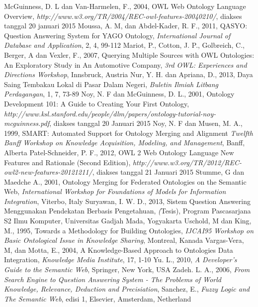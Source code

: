 \begin{thebibliography}{99}
		McGuinness, D. L dan Van-Harmelen, F., 2004, OWL Web Ontology Language Overview, \emph{http://www.w3.org/TR/2004/REC-owl-features-20040210/}, diakses tanggal 20 januari 2015
		Moussa, A. M, dan Abdel-Kader, R. F., 2011, QASYO: Question Answering System for YAGO Ontology, \emph{International Journal of Database and Application}, 2, 4, 99-112
		Mariot, P., Cotton, J. P., Golbreich, C., Berger, A dan Vexler, F., 2007, Querying Multiple Sources with OWL Ontologies: An Exploratory Study in An Automotive Company, \emph{3rd OWL: Experiences and Directions Workshop}, Innsbruck, Austria
		Nur, Y. H. dan Apriana, D., 2013, Daya Saing Tembakau Lokal di Pasar Dalam Negeri, \emph{Buletin Ilmiah Litbang Perdagangan}, 1, 7, 73-89
		Noy, N. F dan McGuinness, D. L., 2001, Ontology Development 101: A Guide to Creating Your First Ontology, \emph{http://www.ksl.stanford.edu/people/dlm/papers/ontology-tutorial-noy-mcguinness.pdf}, diakses tanggal 20 Januari 2015
		Noy, N. F dan Musen, M. A., 1999, SMART: Automated Support for Ontology Merging and Alignment \emph{Twelfth Banff Workshop on Knowledge Acquisition, Modeling, and Management}, Banff, Alberta
		Patel-Schneider, P. F., 2012, OWL 2 Web Ontology Language New Features and Rationale (Second Edition), \emph{http://www.w3.org/TR/2012/REC-owl2-new-features-20121211/}, diakses tanggal 21 Januari 2015
		Stumme, G dan Maedche A., 2001, Ontology Merging for Federated Ontologies on the Semantic Web, \emph{ International Workshop for Foundations of Models for Information Integration}, Viterbo, Italy
		Suryawan, I. W. D., 2013, Sistem Question Answering Menggunakan Pendekatan Berbasis Pengetahuan, \emph(Tesis), Program Pascasarjana S2 Ilmu Komputer, Universitas Gadjah Mada, Yogyakarta
		Uschold, M dan King, M., 1995, Towards a Methodology for Building Ontologies, \emph{IJCAI95 Workshop on Basic Ontological Issue in Knowledge Sharing}, Montreal, Kanada
		Vargas-Vera, M, dan Motta, E., 2004, A Knowledge-Based Approach to Ontologies Data Integration, \emph{Knowledge Media Institute}, 17, 1-10
		Yu. L., 2010, \emph{A Developer's Guide to the Semantic Web}, Springer, New York, USA
		Zadeh. L. A., 2006, \emph{From Search Engine to Question Answering System - The Problems of World Knowledge, Relevance, Deduction and Precisiation}, Sanchez, E., \emph{Fuzzy Logic and The Semantic Web}, edisi 1, Elsevier, Amsterdam, Netherland
\end{thebibliography}